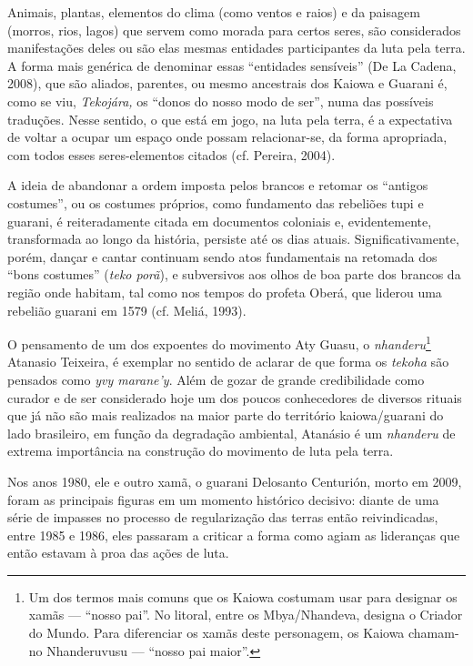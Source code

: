Animais, plantas, elementos do clima (como ventos e raios) e da paisagem
(morros, rios, lagos) que servem como morada para certos seres, são
considerados manifestações deles ou são elas mesmas entidades
participantes da luta pela terra. A forma mais genérica de denominar
essas ``entidades sensíveis'' (De La Cadena, 2008), que são aliados,
parentes, ou mesmo ancestrais dos Kaiowa e Guarani é, como se viu,
\emph{Tekojára,} os ``donos do nosso modo de ser'', numa das possíveis
traduções. Nesse sentido, o que está em jogo, na luta pela terra, é a
expectativa de voltar a ocupar um espaço onde possam relacionar-se, da
forma apropriada, com todos esses seres-elementos citados (cf. Pereira,
2004).

A ideia de abandonar a ordem imposta pelos brancos e retomar os
``antigos costumes'', ou os costumes próprios, como fundamento das
rebeliões tupi e guarani, é reiteradamente citada em documentos
coloniais e, evidentemente, transformada ao longo da história, persiste
até os dias atuais. Significativamente, porém, dançar e cantar continuam
sendo atos fundamentais na retomada dos ``bons costumes'' (\emph{teko
porã}), e subversivos aos olhos de boa parte dos brancos da região onde
habitam, tal como nos tempos do profeta Oberá, que liderou uma rebelião
guarani em 1579 (cf. Meliá, 1993).

O pensamento de um dos expoentes do movimento Aty Guasu, o
\emph{nhanderu}\footnote{Um dos termos mais comuns que os Kaiowa
  costumam usar para designar os xamãs --- ``nosso pai''. No litoral,
  entre os Mbya/Nhandeva, designa o Criador do Mundo. Para diferenciar
  os xamãs deste personagem, os Kaiowa chamam-no Nhanderuvusu ---
  ``nosso pai maior''.} Atanasio Teixeira, é exemplar no sentido de
aclarar de que forma os \emph{tekoha} são pensados como \emph{yvy
marane'y}. Além de gozar de grande credibilidade como curador e de ser
considerado hoje um dos poucos conhecedores de diversos rituais que já
não são mais realizados na maior parte do território kaiowa/guarani do
lado brasileiro, em função da degradação ambiental, Atanásio é um
\emph{nhanderu} de extrema importância na construção do movimento de
luta pela terra.

Nos anos 1980, ele e outro xamã, o guarani Delosanto Centurión, morto em
2009, foram as principais figuras em um momento histórico decisivo:
diante de uma série de impasses no processo de regularização das terras
então reivindicadas, entre 1985 e 1986, eles passaram a criticar a forma
como agiam as lideranças que então estavam à proa das ações de luta.

